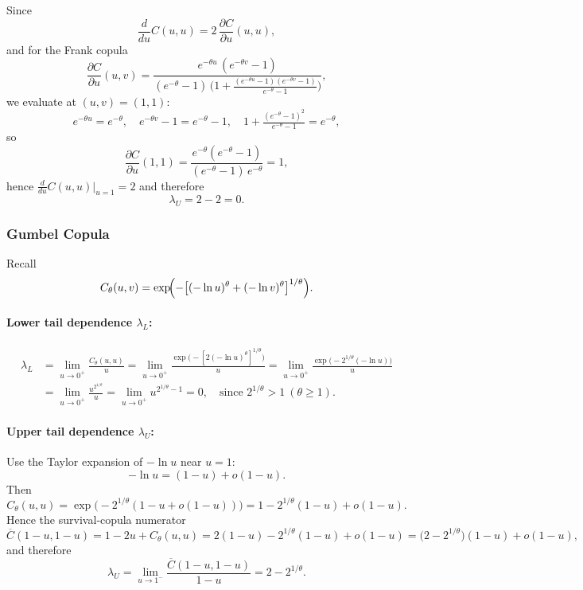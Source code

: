 \documentclass[11pt]{article}
\begin{document}
Since
\[
\frac{d}{du}C(u,u)
=2\,\frac{\partial C}{\partial u}(u,u),
\]
and for the Frank copula
\[
\frac{\partial C}{\partial u}(u,v)
=\frac{e^{-\theta u}\,(e^{-\theta v}-1)}
     {(e^{-\theta}-1)\,\bigl(1+\frac{(e^{-\theta u}-1)(e^{-\theta v}-1)}{e^{-\theta}-1}\bigr)},
\]
we evaluate at \((u,v)=(1,1)\):
\[
e^{-\theta u}=e^{-\theta},\quad e^{-\theta v}-1=e^{-\theta}-1,
\quad 1+\tfrac{(e^{-\theta}-1)^2}{e^{-\theta}-1}=e^{-\theta},
\]
so
\[
\frac{\partial C}{\partial u}(1,1)
=\frac{e^{-\theta}(e^{-\theta}-1)}{(e^{-\theta}-1)\,e^{-\theta}}=1,
\]
hence \(\tfrac{d}{du}C(u,u)\big|_{u=1}=2\) and therefore
\[
\lambda_U
=2-2
=0.
\]

\subsubsection{Gumbel Copula}
Recall
\[
C_\theta(u,v)
=\exp\!\Bigl(-\bigl[(-\ln u)^\theta+(-\ln v)^\theta\bigr]^{1/\theta}\Bigr).
\]

\paragraph{Lower tail dependence \(\lambda_L\):}
\begin{align*}
\lambda_L
&=\lim_{u\to0^+}\frac{C_\theta(u,u)}{u}
=\lim_{u\to0^+}\frac{\exp\!\bigl(-[2(-\ln u)^\theta]^{1/\theta}\bigr)}{u}
=\lim_{u\to0^+}\frac{\exp\!\bigl(-2^{1/\theta}(-\ln u)\bigr)}{u}\\
&=\lim_{u\to0^+}\frac{u^{2^{1/\theta}}}{u}
=\lim_{u\to0^+}u^{2^{1/\theta}-1}
=0,
\quad\text{since }2^{1/\theta}>1\ (\theta\ge1).
\end{align*}

\paragraph{Upper tail dependence \(\lambda_U\):}
Use the Taylor expansion of \(-\ln u\) near \(u=1\):
\[
-\ln u = (1-u)+o(1-u).
\]
Then
\[
C_\theta(u,u)
=\exp\bigl(-2^{1/\theta}(1-u+o(1-u))\bigr)
=1 - 2^{1/\theta}(1-u) + o(1-u).
\]
Hence the survival‐copula numerator
\[
\overline{C}(1-u,1-u)
=1 - 2u + C_\theta(u,u)
=2(1-u) - 2^{1/\theta}(1-u) + o(1-u)
=\bigl(2-2^{1/\theta}\bigr)(1-u)+o(1-u),
\]
and therefore
\[
\lambda_U
=\lim_{u\to1^-}\frac{\overline{C}(1-u,1-u)}{1-u}
=2 - 2^{1/\theta}.
\]
\end{document}
